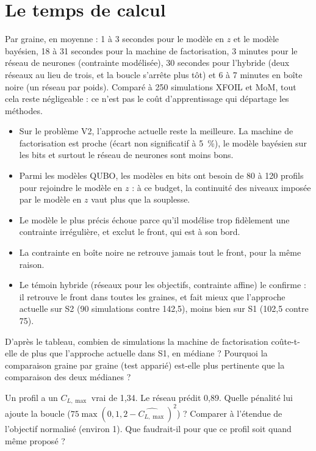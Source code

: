 \section{Le temps de calcul}
Par graine, en moyenne : 1 à 3 secondes pour le modèle en $z$ et le modèle bayésien, 18 à 31 secondes pour la machine de factorisation, 3 minutes pour le réseau de neurones (contrainte modélisée), 30 secondes pour l'hybride (deux réseaux au lieu de trois, et la boucle s'arrête plus tôt) et 6 à 7 minutes en boîte noire (un réseau par poids). Comparé à 250 simulations XFOIL et MoM, tout cela reste négligeable : ce n'est pas le coût d'apprentissage qui départage les méthodes.

\begin{resultat}
\begin{itemize}
\item Sur le problème V2, l'approche actuelle reste la meilleure. La machine de factorisation est proche (écart non significatif à 5~\%), le modèle bayésien sur les bits et surtout le réseau de neurones sont moins bons.
\item Parmi les modèles QUBO, les modèles en bits ont besoin de 80 à 120 profils pour rejoindre le modèle en $z$ : à ce budget, la continuité des niveaux imposée par le modèle en $z$ vaut plus que la souplesse.
\item Le modèle le plus précis échoue parce qu'il modélise trop fidèlement une contrainte irrégulière, et exclut le front, qui est à son bord.
\item La contrainte en boîte noire ne retrouve jamais tout le front, pour la même raison.
\item Le témoin hybride (réseaux pour les objectifs, contrainte affine) le confirme : il retrouve le front dans toutes les graines, et fait mieux que l'approche actuelle sur S2 (90 simulations contre 142,5), moins bien sur S1 (102,5 contre 75).
\end{itemize}
\end{resultat}

\exercices
\begin{exercice}\label{ex:v2-lecture}
D'après le tableau, combien de simulations la machine de factorisation coûte-t-elle de plus que l'approche actuelle dans S1, en médiane ? Pourquoi la comparaison graine par graine (test apparié) est-elle plus pertinente que la comparaison des deux médianes ?
\end{exercice}
\begin{exercice}\label{ex:v2-contrainte}
Un profil a un $C_{L,\max}$ vrai de 1,34. Le réseau prédit 0,89. Quelle pénalité lui ajoute la boucle ($75\max(0,1{,}2-\widehat{C_{L,\max}})^2$) ? Comparer à l'étendue de l'objectif normalisé (environ 1). Que faudrait-il pour que ce profil soit quand même proposé ?
\end{exercice}


